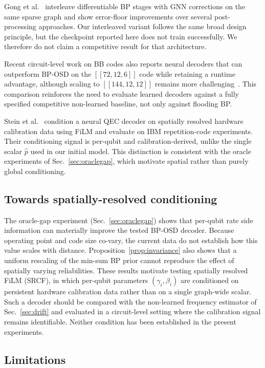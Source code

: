 \documentclass[a4paper,twocolumn,11pt,nopdfoutputerror]{quantumarticle}
\newcommand{\phat}{\hat{p}}
\newcommand{\code}[3]{\ensuremath{[\![#1,#2,#3]\!]}}
\begin{document}
Gong et al.~\cite{Gong2024GNN} interleave differentiable BP stages with
GNN corrections on the same sparse graph and show error-floor
improvements over several post-processing approaches. Our interleaved
variant follows the same broad design principle, but the checkpoint
reported here does not train successfully. We therefore do not claim a
competitive result for that architecture.

Recent circuit-level work on BB codes also reports neural decoders that
can outperform BP-OSD on the $\code{72}{12}{6}$ code while retaining a
runtime advantage, although scaling to $\code{144}{12}{12}$ remains more
challenging~\cite{Blue2026MLBB}. This comparison reinforces the need to evaluate learned decoders against
a fully specified competitive non-learned baseline, not only against
flooding BP.

Stein et al.~\cite{Stein2026FiLM} condition a neural QEC decoder on
spatially resolved hardware calibration data using FiLM and evaluate on
IBM repetition-code experiments. Their conditioning signal is per-qubit
and calibration-derived, unlike the single scalar $\phat$ used in our
initial model. This distinction is consistent with the oracle experiments
of Sec.~\ref{sec:oraclegap}, which motivate spatial rather than purely
global conditioning.
\subsection{Towards spatially-resolved conditioning}\label{sec:srcf}

The oracle-gap experiment (Sec.~\ref{sec:oraclegap}) shows that
per-qubit rate side information can materially improve the tested
BP-OSD decoder. Because operating point and code size co-vary, the
current data do not establish how this value scales with distance.
Proposition~\ref{prop:invariance} also shows that a uniform rescaling
of the min-sum BP prior cannot reproduce the effect of spatially varying
reliabilities. These results motivate testing spatially resolved FiLM
(SRCF), in which per-qubit parameters $(\gamma_i, \beta_i)$ are
conditioned on persistent hardware calibration data rather than on a
single graph-wide scalar. Such a decoder should be compared with the
non-learned frequency estimator of Sec.~\ref{sec:drift} and evaluated
in a circuit-level setting where the calibration signal remains
identifiable. Neither condition has been established in the present
experiments.

\subsection{Limitations}\label{sec:limitations}
\end{document}
